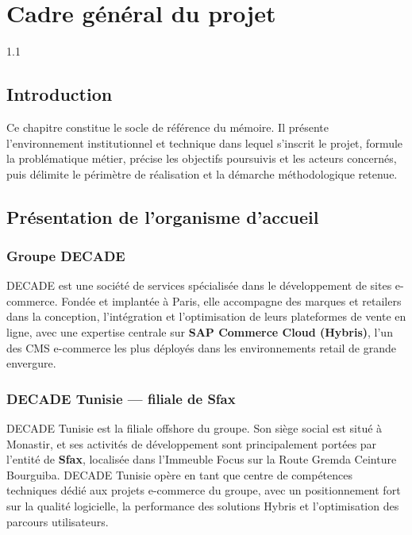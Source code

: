 \chapter{Cadre général du projet}
\label{chap:cadre-general}
\begin{spacing}{1.1}
\minitoc
\thispagestyle{MyStyle}
\end{spacing}
\newpage

\section{Introduction}
Ce chapitre constitue le socle de référence du mémoire. Il présente l'environnement institutionnel et technique dans lequel s'inscrit le projet, formule la problématique métier, précise les objectifs poursuivis et les acteurs concernés, puis délimite le périmètre de réalisation et la démarche méthodologique retenue.

\section{Présentation de l'organisme d'accueil}

\subsection{Groupe DECADE}
DECADE est une société de services spécialisée dans le développement de sites e-commerce. Fondée et implantée à Paris, elle accompagne des marques et retailers dans la conception, l'intégration et l'optimisation de leurs plateformes de vente en ligne, avec une expertise centrale sur \textbf{SAP Commerce Cloud (Hybris)}, l'un des CMS e-commerce les plus déployés dans les environnements retail de grande envergure.

\subsection{DECADE Tunisie — filiale de Sfax}
DECADE Tunisie est la filiale offshore du groupe. Son siège social est situé à Monastir, et ses activités de développement sont principalement portées par l'entité de \textbf{Sfax}, localisée dans l'Immeuble Focus sur la Route Gremda Ceinture Bourguiba. DECADE Tunisie opère en tant que centre de compétences techniques dédié aux projets e-commerce du groupe, avec un positionnement fort sur la qualité logicielle, la performance des solutions Hybris et l'optimisation des parcours utilisateurs.

